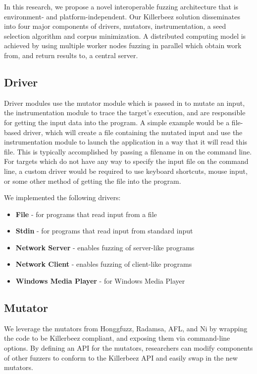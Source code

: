 In this research, we propose a novel interoperable fuzzing architecture that is
environment- and platform-independent. Our Killerbeez solution disseminates
into four major components of drivers, mutators, instrumentation, a seed
selection algorithm and corpus minimization. A distributed computing model is
achieved by using multiple worker nodes fuzzing in parallel which obtain work
from, and return results to, a central server.


\subsection{Driver}
Driver modules use the mutator module which is passed in to mutate an input,
the instrumentation module to trace the target's execution, and are responsible
for getting the input data into the program.  A simple example would be a
file-based driver, which will create a file containing the mutated input and
use the instrumentation module to launch the application in a way that it will
read this file.  This is typically accomplished by passing a filename in on the
command line.  For targets which do not have any way to specify the input file
on the command line, a custom driver would be required to use keyboard
shortcuts, mouse input, or some other method of getting the file into the
program.

We implemented the following drivers:
\begin{itemize}[noitemsep]
\item \textbf{File} - for programs that read input from a file
\item \textbf{Stdin} - for programs that read input from standard input
\item \textbf{Network Server} - enables fuzzing of server-like programs
\item \textbf{Network Client} - enables fuzzing of client-like programs
\item \textbf{Windows Media Player} - for Windows Media Player
\end{itemize}

\subsection{Mutator}
We leverage the mutators from Honggfuzz, Radamsa, AFL, and Ni by wrapping the
code to be Killerbeez compliant, and exposing them via command-line options. By
defining an API for the mutators, researchers can modify components of other
fuzzers to conform to the Killerbeez API and easily swap in the new mutators.

